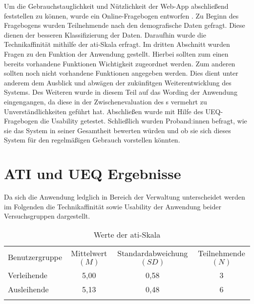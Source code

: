 Um die Gebrauchstauglichkeit und Nützlichkeit der Web-App abschließend
feststellen zu können, wurde ein Online-Fragebogen entworfen . Zu Beginn des Fragebogens wurden Teilnehmende nach den demografische
Daten gefragt. Diese dienen der besseren Klassifizierung der Daten. Daraufhin
wurde die Technikaffinität mithilfe der \ac{ati}-Skala erfragt. Im dritten
Abschnitt wurden Fragen zu den Funktion der Anwendung gestellt. Hierbei sollten
zum einen bereits vorhandene Funktionen Wichtigkeit zugeordnet werden. Zum
anderen sollten noch nicht vorhandene Funktionen angegeben werden. Dies dient
unter anderem dem Ausblick und abwägen der zukünfitgen Weiterentwicklung des
Systems. Des Weiteren wurde in diesem Teil auf das Wording der Anwendung
eingengangen, da diese in der Zwischenevaluation des s
vermehrt zu Unverständlichkeiten geführt hat. Abschließen wurde mit Hilfe des
UEQ-Fragebogen die Usability getestet. Schließlich wurden Proband:innen befragt,
wie sie das System in seiner Gesamtheit bewerten würden und ob sie sich dieses
System für den regelmäßigen Gebrauch vorstellen könnten.



\section{ATI und UEQ Ergebnisse}
Da sich die Anwendung ledglich in Bereich der Verwaltung unterscheidet werden im
Folgenden die Technikaffinität sowie Usability der Anwendung beider
Versuchsgruppen dargestellt.

\begin{table}[h]
  \centering
  \caption{Werte der \ac{ati}-Skala}
  \begin{tabular}{lccc}
    \arrayrulecolor{maincolor}\hline
    \sffamily\color{maincolor}Benutzergruppe &
    \sffamily\color{maincolor}Mittelwert $(M)$ &
    \sffamily\color{maincolor}Standardabweichung $(SD)$ &
    \sffamily\color{maincolor}Teilnehmende $(N)$ \\
    \arrayrulecolor{maincolor}\hline
    Verleihende                              & 5,00 & 0,58
                                             & 3 \\
    Ausleihende                              & 5,13 & 0,48
                                             & 6 \\
    \arrayrulecolor{maincolor}\hline
  \end{tabular}
  \label{table:atipartzwei}
\end{table}


